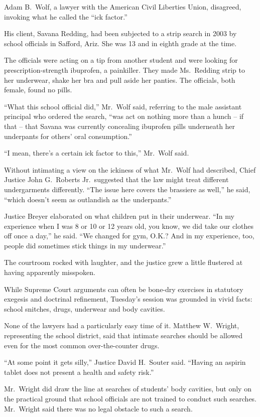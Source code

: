 \documentclass[12pt,a4paper,onecolumn]{article}
\begin{document}
Adam B.~Wolf, a lawyer with the American Civil Liberties Union, disagreed, invoking what he called
the ``ick factor.''

His client, Savana Redding, had been subjected to a strip search in 2003 by school officials in
Safford, Ariz. She was 13 and in eighth grade at the time.

The officials were acting on a tip from another student and were looking for prescription-strength
ibuprofen, a painkiller. They made Ms.~Redding strip to her underwear, shake her bra and pull aside
her panties. The officials, both female, found no pills.

``What this school official did,'' Mr.~Wolf said, referring to the male assistant principal who
ordered the search, ``was act on nothing more than a hunch -- if that -- that Savana was currently
concealing ibuprofen pills underneath her underpants for others' oral consumption.''

``I mean, there's a certain ick factor to this,'' Mr.~Wolf said.

Without intimating a view on the ickiness of what Mr.~Wolf had described, Chief Justice John
G.~Roberts Jr.~suggested that the law might treat different undergarments differently. ``The issue
here covers the brassiere as well,'' he said, ``which doesn't seem as outlandish as the
underpants.''

Justice Breyer elaborated on what children put in their underwear. ``In my experience when I was 8
or 10 or 12 years old, you know, we did take our clothes off once a day,'' he said. ``We changed for
gym, O.K.? And in my experience, too, people did sometimes stick things in my underwear.''

The courtroom rocked with laughter, and the justice grew a little flustered at having apparently
misspoken.

While Supreme Court arguments can often be bone-dry exercises in statutory exegesis and doctrinal
refinement, Tuesday's session was grounded in vivid facts: school snitches, drugs, underwear and
body cavities.

None of the lawyers had a particularly easy time of it. Matthew W.~Wright, representing the school
district, said that intimate searches should be allowed even for the most common over-the-counter
drugs.

``At some point it gets silly,'' Justice David H.~Souter said. ``Having an aspirin tablet does not
present a health and safety risk.''

Mr.~Wright did draw the line at searches of students' body cavities, but only on the practical
ground that school officials are not trained to conduct such searches. Mr.~Wright said there was no
legal obstacle to such a search.
\end{document}
